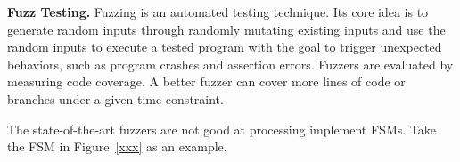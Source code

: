 \noindent\textbf{Fuzz Testing.}
Fuzzing is an automated testing technique. Its core idea is 
to generate random inputs through randomly mutating existing inputs and 
use the random inputs to execute 
a tested program with the goal to trigger unexpected behaviors,
such as program crashes and assertion errors.
Fuzzers are evaluated by measuring code coverage. 
A better fuzzer can cover more lines of code 
or branches under a given time constraint. 

The state-of-the-art fuzzers are not good at processing 
implement FSMs.
Take the FSM in Figure~\ref{xxx} as an example. 
